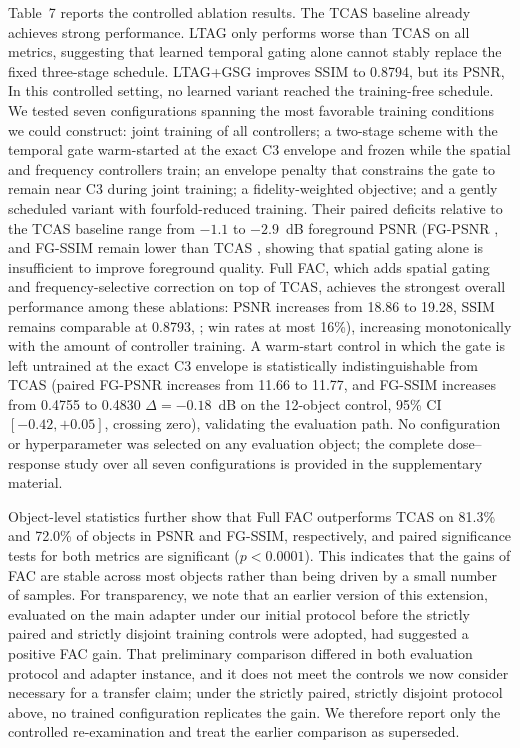 \documentclass[times,twocolumn,final]{elsarticle}
\providecommand{\DIFadd}[1]{{\protect\color{blue} \sf #1}} %
\providecommand{\DIFdel}[1]{{\protect\color{red} \scriptsize #1}} %
\providecommand{\DIFaddbegin}{} %
\providecommand{\DIFaddend}{} %
\providecommand{\DIFdelbegin}{} %
\providecommand{\DIFdelend}{} %
\newcommand{\DIFscaledelfig}{0.5}
\newlength{\DIFdelgraphicswidth} %
\newlength{\DIFdelgraphicsheight} %
\newcommand{\DIFaddincludegraphics}[2][]{{\color{blue}\fbox{\DIFOincludegraphics[#1]{#2}}}} %
\newcommand{\DIFdelincludegraphics}[2][]{%
\sbox{\DIFdelgraphicsbox}{\DIFOincludegraphics[#1]{#2}}%
\settoboxwidth{\DIFdelgraphicswidth}{\DIFdelgraphicsbox} %
\settoboxtotalheight{\DIFdelgraphicsheight}{\DIFdelgraphicsbox} %
\scalebox{\DIFscaledelfig}{%
\parbox[b]{\DIFdelgraphicswidth}{\usebox{\DIFdelgraphicsbox}\\[-\baselineskip] \rule{\DIFdelgraphicswidth}{0em}}\llap{\resizebox{\DIFdelgraphicswidth}{\DIFdelgraphicsheight}{%
\setlength{\unitlength}{\DIFdelgraphicswidth}%
\begin{picture}(1,1)%
\thicklines\linethickness{2pt} %
{\color[rgb]{1,0,0}\put(0,0){\framebox(1,1){}}}%
{\color[rgb]{1,0,0}\put(0,0){\line( 1,1){1}}}%
{\color[rgb]{1,0,0}\put(0,1){\line(1,-1){1}}}%
\end{picture}%
}\hspace*{3pt}}} %
} %
\DeclareRobustCommand{\DIFaddbegin}{\DIFOaddbegin \let\includegraphics\DIFaddincludegraphics} %
\DeclareRobustCommand{\DIFaddend}{\DIFOaddend \let\includegraphics\DIFOincludegraphics} %
\DeclareRobustCommand{\DIFdelbegin}{\DIFOdelbegin \let\includegraphics\DIFdelincludegraphics} %
\DeclareRobustCommand{\DIFdelend}{\DIFOaddend \let\includegraphics\DIFOincludegraphics} %
\begin{document}
\DIFdel{Table~7 reports the controlled ablation results. The TCAS baseline already achieves strong performance. LTAG only performs worse than TCAS on all metrics, suggesting that learned temporal gating alone cannot stably replace the fixed three-stage schedule. LTAG+GSG improves SSIM to 0.8794, but its PSNR, }\DIFdelend \DIFaddbegin \DIFadd{In this controlled setting, no learned variant reached the training-free schedule. We tested seven configurations spanning the most favorable training conditions we could construct: joint training of all controllers; a two-stage scheme with the temporal gate warm-started at the exact C3 envelope and frozen while the spatial and frequency controllers train; an envelope penalty that constrains the gate to remain near C3 during joint training; a fidelity-weighted objective; and a gently scheduled variant with fourfold-reduced training. Their paired deficits relative to the TCAS baseline range from $-1.1$ to $-2.9$~dB foreground PSNR (}\DIFaddend FG-PSNR\DIFdelbegin \DIFdel{, and FG-SSIM remain lower than TCAS , showing that spatial gating alone is insufficient to improve foreground quality. Full FAC, which adds spatial gating and frequency-selective correction on top of TCAS, achieves the strongest overall performance among these ablations: PSNR increases from 18.86 to 19.28, SSIM remains comparable at 0.8793, }\DIFdelend \DIFaddbegin \DIFadd{; win rates at most 16\%), increasing monotonically with the amount of controller training. A warm-start control in which the gate is left untrained at the exact C3 envelope is statistically indistinguishable from TCAS (paired }\DIFaddend FG-PSNR \DIFdelbegin \DIFdel{increases from 11.66 to 11.77, and FG-SSIM increases from 0.4755 to 0.4830}\DIFdelend \DIFaddbegin \DIFadd{$\Delta=-0.18$~dB on the 12-object control, 95\% CI $[-0.42,+0.05]$, crossing zero), validating the evaluation path. No configuration or hyperparameter was selected on any evaluation object; the complete dose--response study over all seven configurations is provided in the supplementary material}\DIFaddend .

\DIFdelbegin \DIFdel{Object-level statistics further show that Full FAC outperforms TCAS on 81.3\% and 72.0\% of objects in PSNR and FG-SSIM, respectively, and paired significance tests for both metrics are significant ($p < 0.0001$). This indicates that the gains of FAC are stable across most objects rather than being driven by a small number of samples.
}\DIFdelend \DIFaddbegin \DIFadd{For transparency, we note that an earlier version of this extension, evaluated on the main adapter under our initial protocol before the strictly paired and strictly disjoint training controls were adopted, had suggested a positive FAC gain. That preliminary comparison differed in both evaluation protocol and adapter instance, and it does not meet the controls we now consider necessary for a transfer claim; under the strictly paired, strictly disjoint protocol above, no trained configuration replicates the gain. We therefore report only the controlled re-examination and treat the earlier comparison as superseded.
}\DIFaddend 
\end{document}
